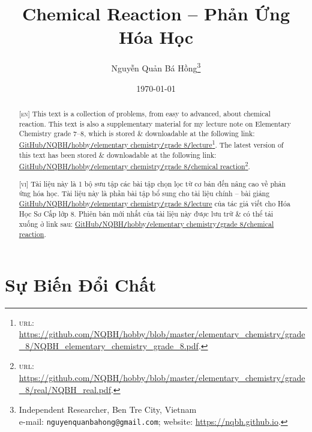 \documentclass{article}
\title{Chemical Reaction -- Phản Ứng Hóa Học}
\author{Nguyễn Quản Bá Hồng\footnote{Independent Researcher, Ben Tre City, Vietnam\\e-mail: \texttt{nguyenquanbahong@gmail.com}; website: \url{https://nqbh.github.io}.}}
\date{\today}
\numberwithin{equation}{section}
\begin{document}
\maketitle
\begin{abstract}
	\textsc{[en]} This text is a collection of problems, from easy to advanced, about chemical reaction. This text is also a supplementary material for my lecture note on Elementary Chemistry grade 7--8, which is stored \& downloadable at the following link: \href{https://github.com/NQBH/hobby/blob/master/elementary_chemistry/grade_8/NQBH_elementary_chemistry_grade_8.pdf}{GitHub\texttt{/}NQBH\texttt{/}hobby\texttt{/}elementary chemistry\texttt{/}grade 8\texttt{/}lecture}\footnote{\textsc{url}: \url{https://github.com/NQBH/hobby/blob/master/elementary_chemistry/grade_8/NQBH_elementary_chemistry_grade_8.pdf}.}. The latest version of this text has been stored \& downloadable at the following link: \href{https://github.com/NQBH/hobby/blob/master/elementary_chemistry/grade_8/real/NQBH_real.pdf}{GitHub\texttt{/}NQBH\texttt{/}hobby\texttt{/}elementary chemistry\texttt{/}grade 8\texttt{/}chemical reaction}\footnote{\textsc{url}: \url{https://github.com/NQBH/hobby/blob/master/elementary_chemistry/grade_8/real/NQBH_real.pdf}.}.
	\vspace{2mm}
	
	\textsc{[vi]} Tài liệu này là 1 bộ sưu tập các bài tập chọn lọc từ cơ bản đến nâng cao về phản ứng hóa học. Tài liệu này là phần bài tập bổ sung cho tài liệu chính -- bài giảng \href{https://github.com/NQBH/hobby/blob/master/elementary_chemistry/grade_8/NQBH_elementary_chemistry_grade_8.pdf}{GitHub\texttt{/}NQBH\texttt{/}hobby\texttt{/}elementary chemistry\texttt{/}grade 8\texttt{/}lecture} của tác giả viết cho Hóa Học Sơ Cấp lớp 8. Phiên bản mới nhất của tài liệu này được lưu trữ \& có thể tải xuống ở link sau: \href{https://github.com/NQBH/hobby/blob/master/elementary_chemistry/grade_8/real/NQBH_real.pdf}{GitHub\texttt{/}NQBH\texttt{/}hobby\texttt{/}elementary chemistry\texttt{/}grade 8\texttt{/}chemical reaction}.
\end{abstract}
\setcounter{secnumdepth}{4}
\setcounter{tocdepth}{3}
\tableofcontents


\section{Sự Biến Đổi Chất}
\end{document}
